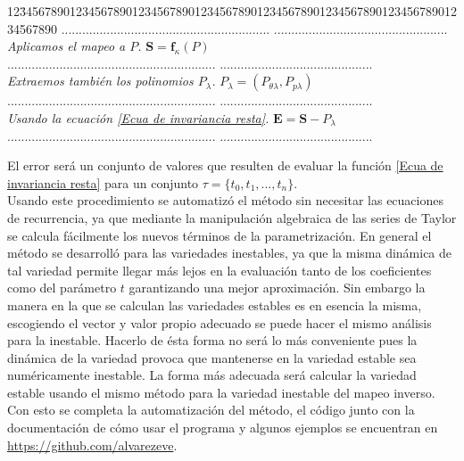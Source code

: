 \begin{tabbing}
12\=34567890123456789012345678901234567890123456\=7890123456789012345678901234567890\kill%
\>............................................................  \>..................................................\\
\>\textsl{Aplicamos el mapeo a $P$.}\> $\mathbf{S}=\mathbf{f}_{\kappa}(P)$ \\
\> ............................................................ \>............................................\\
\>\textsl{Extraemos también los polinomios $P_{\lambda}$.}\> $P_{\lambda}=(P_{\theta\lambda},P_{p\lambda})$\\
\> ............................................................ \>............................................\\
\> \textsl{Usando la ecuación \ref{Ecua de invariancia resta}.}\> $\mathbf{E} =\mathbf{S}-P_{\lambda}$\\
\> ............................................................ \>............................................\\

\end{tabbing}
El error será un conjunto de valores que resulten de evaluar la función \ref{Ecua de invariancia resta} para un conjunto $\tau = \lbrace t_{0},t_{1},..., t_{n} \rbrace$. \\

Usando este procedimiento se automatizó el método sin necesitar las ecuaciones de recurrencia, ya que mediante la manipulación algebraica de las series de Taylor se calcula fácilmente los nuevos términos de la parametrización. En general el método se desarrolló para las variedades inestables, ya que la misma dinámica de tal variedad permite llegar más lejos en la evaluación tanto de los coeficientes como del parámetro $t$ garantizando una mejor aproximación. Sin embargo la manera en la que se calculan las variedades estables es en esencia la misma, escogiendo el vector y valor propio adecuado se puede hacer el mismo análisis para la inestable. Hacerlo de ésta forma no será lo más conveniente pues la dinámica de la variedad provoca que mantenerse en la variedad estable sea numéricamente inestable. La forma más adecuada será calcular la variedad estable usando el mismo método para la variedad inestable del mapeo inverso. \\



Con esto se completa la automatización del método, el código junto con la documentación de cómo usar el programa y algunos ejemplos se encuentran en \url{https://github.com/alvarezeve}. 






